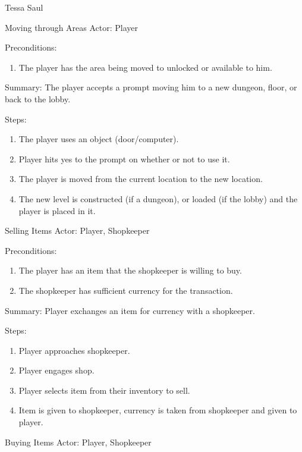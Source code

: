 \documentclass[12pt]{report}
\begin{document}
\begin{section}{Tessa Saul}
\begin{subsection}{Moving through Areas}
Actor: Player

Preconditions:
\begin{enumerate}
\item The player has the area being moved to unlocked or available to him.
\end{enumerate}

Summary: The player accepts a prompt moving him to a new dungeon, floor, or
back to the lobby.

Steps:
\begin{enumerate}
\item The player uses an object (door/computer).
\item Player hits yes to the prompt on whether or not to use it.
\item The player is moved from the current location to the new location.
\item The new level is constructed (if a dungeon), or loaded (if the lobby)
and the player is placed in it.
\end{enumerate}
\end{subsection}

\begin{subsection}{Selling Items}
Actor: Player, Shopkeeper

Preconditions:
\begin{enumerate}
\item The player has an item that the shopkeeper is willing to buy.
\item The shopkeeper has sufficient currency for the transaction.
\end{enumerate}

Summary: Player exchanges an item for currency with a shopkeeper.

Steps: 
\begin{enumerate}
\item Player approaches shopkeeper.
\item Player engages shop.
\item Player selects item from their inventory to sell.
\item Item is given to shopkeeper, currency is taken from shopkeeper and
given to player.
\end{enumerate}
\end{subsection}

\begin{subsection}{Buying Items}
Actor: Player, Shopkeeper


\end{subsection}
\end{section}
\end{document}
